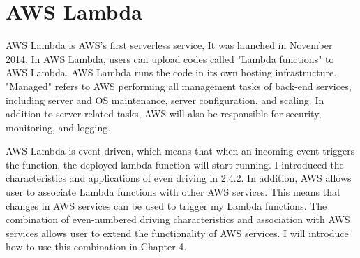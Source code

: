\section{AWS Lambda}
AWS Lambda is AWS’s first serverless service,
It was launched in November 2014. In AWS Lambda, users can upload codes called "Lambda functions" to AWS Lambda. AWS Lambda runs the code in its own hosting infrastructure. "Managed" refers to AWS performing all management tasks of back-end services, including server and OS maintenance, server configuration, and scaling. In addition to server-related tasks, AWS will also be responsible for security, monitoring, and logging.
\par
AWS Lambda is event-driven, which means that when an incoming event triggers the function, the deployed lambda function will start running. I introduced the characteristics and applications of even driving in 2.4.2. In addition, AWS allows user to associate Lambda functions with other AWS services. This means that changes in AWS services can be used to trigger my Lambda functions. The combination of even-numbered driving characteristics and association with AWS services allows user to extend the functionality of AWS services. I will introduce how to use this combination in Chapter 4.
